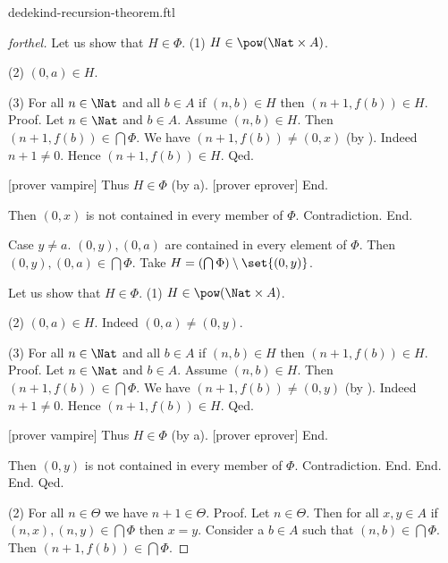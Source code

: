 \documentclass{naproche-library}
\begin{document}
\begin{smodule}[title=Dedekind's Recursion Theorem]{dedekind-recursion-theorem.ftl}
\begin{proof}[forthel]
            Let us show that $H \in \Phi$.
              (1) $H \in \pow(\Nat \times A)$.

              (2) $(0,a) \in H$.

              (3) For all $n \in \Nat$ and all $b \in A$ if
              $(n,b) \in H$ then $(n + 1, f(b)) \in H$. \newline
              Proof.
                Let $n \in \Nat$ and $b \in A$.
                Assume $(n,b) \in H$.
                Then $(n + 1, f(b)) \in \bigcap \Phi$.
                We have $(n + 1, f(b)) \neq (0,x)$ (by ).
                Indeed $n + 1 \neq 0$.
                Hence $(n + 1, f(b)) \in H$.
              Qed.

              [prover vampire]
              Thus $H \in \Phi$ (by a).
              [prover eprover]
            End.

            Then $(0,x)$ is not contained in every member of $\Phi$.
            Contradiction.
          End.

          Case $y \neq a$.
            $(0,y), (0,a)$ are contained in every element of $\Phi$.
            Then $(0,y), (0,a) \in \bigcap \Phi$.
            Take $H = (\bigcap \Phi) \setminus \set{(0,y)}$.

            Let us show that $H \in \Phi$.
              (1) $H \in \pow(\Nat \times A)$.

              (2) $(0,a) \in H$.
              Indeed $(0,a) \neq (0,y)$.

              (3) For all $n \in \Nat$ and all $b \in A$ if
              $(n,b) \in H$ then $(n + 1, f(b)) \in H$. \newline
              Proof.
                Let $n \in \Nat$ and $b \in A$.
                Assume $(n,b) \in H$.
                Then $(n + 1, f(b)) \in \bigcap \Phi$.
                We have $(n + 1, f(b)) \neq (0,y)$ (by ).
                Indeed $n + 1 \neq 0$.
                Hence $(n + 1, f(b)) \in H$.
              Qed.

              [prover vampire]
              Thus $H \in \Phi$ (by a).
              [prover eprover]
            End.

            Then $(0,y)$ is not contained in every member of $\Phi$.
            Contradiction.
          End.
        End.
      End.
    Qed.

    (2) For all $n \in \Theta$ we have $n + 1 \in \Theta$. \newline
    Proof.
      Let $n \in \Theta$.
      Then for all $x, y \in A$ if $(n, x), (n, y) \in \bigcap \Phi$ then
      $x = y$.
      Consider a $b \in A$ such that $(n,b) \in \bigcap \Phi$.
      Then $(n + 1, f(b)) \in \bigcap \Phi$.


\end{proof}
\end{smodule}
\end{document}

